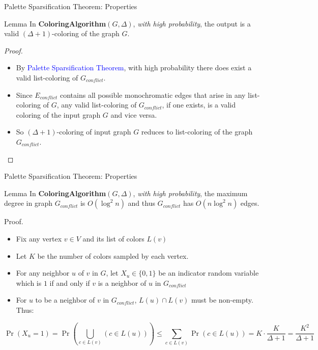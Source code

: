 \documentclass[aspectratio=169,xcolor=dvipsnames]{beamer}
\begin{document}
	\begin{frame}{Palette Sparsification Theorem: Properties}
		\begin{block}{Lemma}
			In \textbf{ColoringAlgorithm$(G,\Delta)$}, \textit{with
				high probability}, the output is a valid \alert{$(\Delta + 1)$}-coloring of the graph \alert{$G$}.
		\end{block}
		
		\begin{proof}
			\begin{itemize}
				\item By \textcolor{blue}{Palette Sparsification Theorem}, with high probability there does exist a valid list-coloring of \alert{$G_{conflict}$}.
				\item Since \alert{$E_{conflict}$} contains all possible monochromatic edges that arise in any list-coloring of \alert{$G$}, any valid list-coloring of \alert{$G_{conflict}$}, if one exists, is a valid coloring of the input graph \alert{$G$} and vice versa.
				\item So \alert{$(\Delta + 1)$}-coloring of input graph \alert{$G$} reduces to list-coloring of the graph \alert{$G_{conflict}$}.
			\end{itemize}
		\end{proof}
	\end{frame}
	
	\begin{frame}{Palette Sparsification Theorem: Properties}
		\begin{block}{Lemma}
			In \textbf{ColoringAlgorithm$(G,\Delta)$}, \textit{with
				high probability}, the maximum degree in graph \alert{$G_{conflict}$} is \alert{$O({\log^2{n}})$} and
			thus \alert{$G_{conflict}$} has \alert{$O(n{\log^2{n}})$} edges.
		\end{block}
		
		\begin{block}{Proof.}
			\begin{itemize}
				\item Fix any vertex $v \in V$ and its list of colors $L(v)$
				\item Let $K$ be the number of colors sampled by each vertex.
				\item For any neighbor $u$ of $v$ in $G$, let $X_u \in \{0, 1\}$ be an indicator random variable which is $1$ if and only if $v$ is a neighbor of $u$ in $G_{conflict}$
				\item For $u$ to be a neighbor of $v$ in $G_{conflict}$, $L(u) \cap L(v)$ must be non-empty. Thus:
			\end{itemize}
			\[
			\Pr(X_u = 1) = \Pr\left( \bigcup_{c \in L(v)} (c \in L(u)) \right)
			\leq \sum_{c \in L(v)} \Pr(c \in L(u))
			= K \cdot \frac{K}{\Delta + 1}
			= \frac{K^2}{\Delta + 1}
			\]
		\end{block}
	\end{frame}
	
\end{document}
